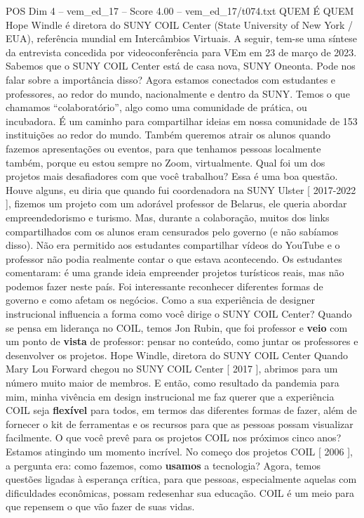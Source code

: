 \begin{textsample}{POS Dim 4 – vem\_ed\_17 – Score 4.00 – vem\_ed\_17/t074.txt}  \label{ex:f4_pos_083}
QUEM É QUEM Hope Windle é diretora do SUNY COIL Center (State University of New York / EUA), referência mundial em Intercâmbios Virtuais.
A seguir, tem-se uma síntese da entrevista concedida por videoconferência para VEm em 23 de março de 2023.
Sabemos que o SUNY COIL Center está de casa nova, SUNY Oneonta.
Pode nos falar sobre a importância disso?
Agora estamos conectados com estudantes e professores, ao redor do mundo, nacionalmente e dentro da SUNY.
Temos o que chamamos “colaboratório”, algo como uma comunidade de prática, ou incubadora.
É um caminho para compartilhar ideias em nossa comunidade de 153 instituições ao redor do mundo.
Também queremos atrair os alunos quando fazemos apresentações ou eventos, para que tenhamos pessoas localmente também, porque eu estou sempre no Zoom, virtualmente.
Qual foi um dos projetos mais desafiadores com que você trabalhou?
Essa é uma boa questão.
Houve alguns, eu diria que quando fui coordenadora na SUNY Ulster [ 2017-2022 ], fizemos um projeto com um adorável professor de Belarus, ele queria abordar empreendedorismo e turismo.
Mas, durante a colaboração, muitos dos links compartilhados com os alunos eram censurados pelo governo (e não sabíamos disso).
Não era permitido aos estudantes compartilhar vídeos do YouTube e o professor não podia realmente contar o que estava acontecendo.
Os estudantes comentaram: é uma grande ideia empreender projetos turísticos reais, mas não podemos fazer neste país.
Foi interessante reconhecer diferentes formas de governo e como afetam os negócios.
Como a sua experiência de designer instrucional influencia a forma como você dirige o SUNY COIL Center?
Quando se pensa em liderança no COIL, temos Jon Rubin, que foi professor e \textbf{veio} com um ponto de \textbf{vista} de professor: pensar no conteúdo, como juntar os professores e desenvolver os projetos.
Hope Windle, diretora do SUNY COIL Center Quando Mary Lou Forward chegou no SUNY COIL Center [ 2017 ], abrimos para um número muito maior de membros.
E então, como resultado da pandemia para mim, minha vivência em design instrucional me faz querer que a experiência COIL seja \textbf{flexível} para todos, em termos das diferentes formas de fazer, além de fornecer o kit de ferramentas e os recursos para que as pessoas possam visualizar facilmente.
O que você prevê para os projetos COIL nos próximos cinco anos?
Estamos atingindo um momento incrível.
No começo dos projetos COIL [ 2006 ], a pergunta era: como fazemos, como \textbf{usamos} a tecnologia?
Agora, temos questões ligadas à esperança crítica, para que pessoas, especialmente aquelas com dificuldades econômicas, possam redesenhar sua educação.
COIL é um meio para que repensem o que vão fazer de suas vidas.

\end{textsample}
